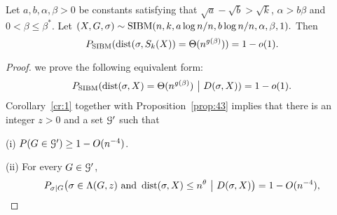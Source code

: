 \documentclass{article}
\begin{document}
\begin{theorem}  \label{thm:dist}
	Let $a,b,\alpha,\beta> 0$ be constants satisfying that
	$\sqrt{a}-\sqrt{b} > \sqrt{k}$, $\alpha>b\beta$ and $0<\beta\le \beta^\ast$.
	Let 
	$
	(X,G,\sigma) \sim \operatorname{SIBM}(n, k, a\log n/n, b\log n/n, \alpha, \beta, 1) .
	$
	Then
	$$
	P_{\operatorname{SIBM}}(\operatorname{dist}(\sigma, S_k(X)) = \Theta(n^{g(\beta)}) ) = 1-o(1) .
	$$
\end{theorem}
\begin{proof}
	we prove the following equivalent form:
	$$
	P_{\operatorname{SIBM}}(\operatorname{dist}(\sigma, X) = \Theta(n^{g(\beta)}) ~\big|~ D(\sigma, X) ) = 1-o(1) .
	$$
	Corollary~\ref{cr:1} together with Proposition~\ref{prop:43} implies that there is an integer $z>0$ and a set $\mathcal{G}'$ such that
	
	\noindent (i)
	$P(G\in\mathcal{G}') \ge 1- O(n^{-4})$.
	
	\noindent (ii) For every $G\in\mathcal{G}'$, 
	\begin{equation}  \label{eq:hs}
	P_{\sigma|G} \big( \sigma \in  \Lambda(G, z)
	\text{~and~} \operatorname{dist}(\sigma, X) \le n^\theta ~\big|~ D(\sigma, X) \big) 
	=1- O(n^{-4}) ,
	\end{equation}


\end{proof}
\end{document}
